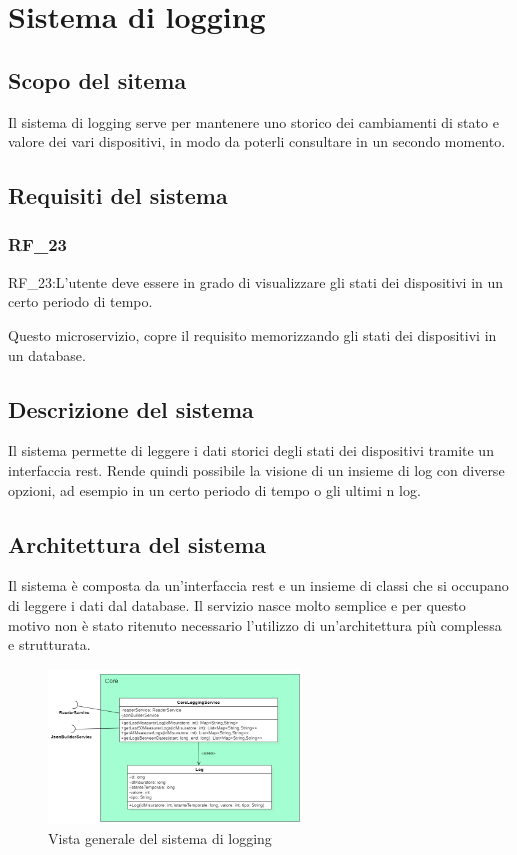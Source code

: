 \chapter{Sistema di logging}\label{cap:microservizio-logging}

\section{Scopo del sitema}

Il sistema di logging serve per mantenere uno storico dei cambiamenti di stato e valore dei vari dispositivi, in modo da poterli consultare in un secondo momento. 

\section{Requisiti del sistema}

\subsection{RF\_23}

RF\_23:L'utente deve essere in grado di visualizzare gli stati dei dispositivi in un certo periodo di tempo.

Questo microservizio, copre il requisito memorizzando gli stati dei dispositivi in un database.

\section{Descrizione del sistema}
Il sistema permette di leggere i dati storici degli stati dei dispositivi tramite un interfaccia rest. Rende quindi possibile la visione di un insieme di log con diverse opzioni, ad esempio in un certo periodo di tempo o gli ultimi n log.

\section{Architettura del sistema}

Il sistema è composta da un'interfaccia rest e un insieme di classi che si occupano di leggere i dati dal database.
Il servizio nasce molto semplice e per questo motivo non è stato ritenuto necessario l'utilizzo di un'architettura più complessa e strutturata.

\begin{figure}[ht]
    \centering
    \includegraphics[width=0.6\textwidth]{img/classi_logging.png}
    \caption{Vista generale del sistema di logging}
    \label{fig:general_logging}
\end{figure}

